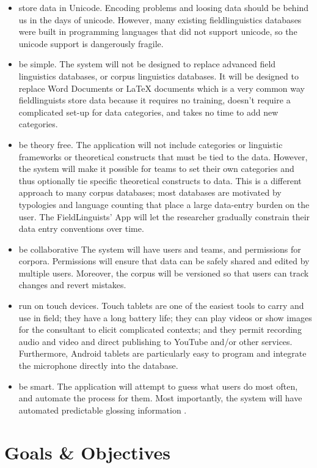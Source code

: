 \documentclass[12 pt]{article}
\begin{document}
\begin{itemize}
\item store data in Unicode. Encoding problems and loosing data should be behind us in the days of unicode. However, many existing fieldlinguistics databases were built in programming languages that did not support unicode, so the unicode support is dangerously fragile.
\item be simple. The system will not be designed to replace advanced field linguistics databases, or corpus linguistics databases. It will be designed to replace Word Documents or LaTeX documents which is a very common way fieldlinguists store data because it requires no training, doesn't require a complicated set-up for data categories, and takes no time to add new categories.
\item be theory free. The application will not include categories or linguistic frameworks or theoretical constructs that must be tied to the data. However, the system will make it possible for teams to set their own categories and thus optionally tie specific theoretical constructs to data. This is a different approach to many corpus databases; most databases are motivated by typologies and language counting that place a large data-entry burden on the user. The FieldLinguists' App will let the researcher gradually constrain their data entry conventions over time.
\item be collaborative The system will have users and teams, and permissions for corpora. Permissions will ensure that data can be safely shared and edited by multiple users. Moreover, the corpus will be versioned so that users can track changes and revert mistakes.
\item run on touch devices. Touch tablets are one of the easiest tools to carry and use in field; they have a long battery life; they can play videos or show images for the consultant to elicit complicated contexts; and they permit recording audio and video and direct publishing to YouTube and/or other services. Furthermore, Android tablets are particularly easy to program and integrate the microphone directly into the database. 
\item be smart. The application will attempt to guess what users do most often, and automate the process for them. Most importantly, the system will have automated predictable glossing information .


\end{itemize}


\section {Goals \& Objectives}
\end{document}
